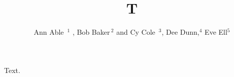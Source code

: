\documentclass{nosuchclass}
\def\Authors{Ann Able\, $^{1}$ , Bob Baker\,$^{2}$ and Cy Cole \,$^{3}$, Dee Dunn,$^{4}$ Eve Ell$^{5}$}
\begin{document}
\title{T}
\author{\Authors}
\maketitle
Text.
\end{document}
